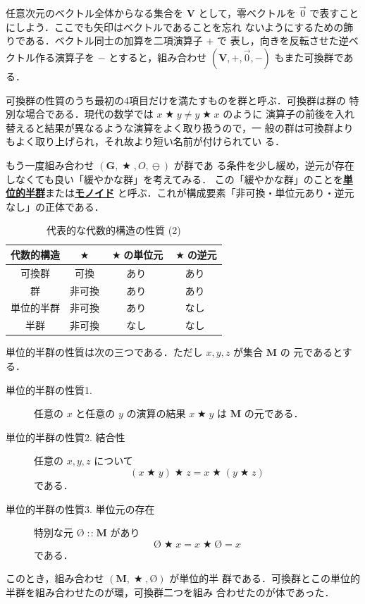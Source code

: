 \documentclass[a5paper,twoside,fleqn,draft]{jsbook}
\newcommand{\keyword}[1]{{\underline{\textbf{#1}}}}
\newcommand{\mZero}{\text{\O}}
\DeclareMathOperator{\mBinOp}{\bigstar}
\DeclareMathOperator{\mIn}{{:\!:}}
\DeclareMathOperator{\mMinus}{\ominus}
\newcommand{\mSet}[1]{\mathbf{#1}}
\newcommand{\mTupleWith}[1]{\left(#1\right)}
\newcommand{\mVec}[1]{\Vec{#1}}
\begin{document}
任意次元のベクトル全体からなる集合を $\mSet{V}$ として，零ベクトルを
$\mVec{0}$ で表すことにしよう．ここでも矢印はベクトルであることを忘れ
ないようにするための飾りである．ベクトル同士の加算を二項演算子 $+$ で
表し，向きを反転させた逆ベクトル作る演算子を $-$ とすると，組み合わせ
$\mTupleWith{\mSet{V},+,\mVec{0},-}$ もまた可換群である．

可換群の性質のうち最初の4項目だけを満たすものを群と呼ぶ．可換群は群の
特別な場合である．現代の数学では $x\mBinOp y\neq y\mBinOp x$ のように
演算子の前後を入れ替えると結果が異なるような演算をよく取り扱うので，一
般の群は可換群よりもよく取り上げられ，それ故より短い名前が付けられてい
る．

もう一度組み合わせ $\mTupleWith{\mSet{G},\mBinOp,O,\mMinus}$ が群であ
る条件を少し緩め，逆元が存在しなくても良い「緩やかな群」を考えてみる．
この「緩やかな群」のことを\keyword{単位的半群}または\keyword{モノイド}
と呼ぶ．これが構成要素「非可換・単位元あり・逆元なし」の正体である．

\begin{table}
\caption{代表的な代数的構造の性質 (2)}
\label{tab:group-and-monoid}
\begin{center}
\begin{tabular}{||c||c|c|c||}
\hline
代数的構造&$\mBinOp$&$\mBinOp$の単位元&$\mBinOp$の逆元\\
\hline\hline
可換群&可換&あり&あり\\
群&非可換&あり&あり\\
単位的半群&非可換&あり&なし\\
半群&非可換&なし&なし\\
\hline
\end{tabular}
\end{center}
\end{table}

単位的半群の性質は次の三つである．ただし $x,y,z$ が集合 $\mSet{M}$ の
元であるとする．
\begin{description}
\item[単位的半群の性質1.] 任意の $x$ と任意の $y$ の演算の結果
$x\mBinOp y$ は $\mSet{M}$ の元である．
\item[単位的半群の性質2. 結合性] 任意の $x,y,z$ について
\begin{equation}
(x\mBinOp y)\mBinOp z=x\mBinOp(y\mBinOp z)
\end{equation}
である．
\item[単位的半群の性質3. 単位元の存在] 特別な元 $\mZero\mIn\mSet{M}$ があり
\begin{equation}
\mZero\mBinOp x=x\mBinOp\mZero=x
\end{equation}
である．
\end{description}
このとき，組み合わせ $\mTupleWith{\mSet{M},\mBinOp,\mZero}$ が単位的半
群である．可換群とこの単位的半群を組み合わせたのが環，可換群二つを組み
合わせたのが体であった．
\end{document}
